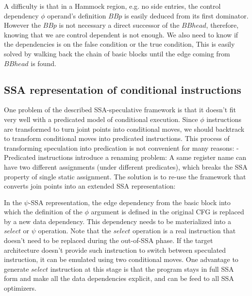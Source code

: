 A difficulty is that in a Hammock region, e.g. no side entries, the control dependency $\phi$ operand's definition $BBp$ is easily deduced from its first dominator. However the $BBp$ is not necessary a direct successor of the $BBhead$, therefore, knowing that we are control dependent is not enough. We also need to know if the dependencies is on the false condition or the true condition, This is easily solved by walking back the chain of basic blocks until the edge coming from $BBhead$ is found.

\subsection{SSA representation of conditional instructions}

One problem of the described SSA-speculative framework is that it doesn't fit very well with a predicated model of conditional execution. Since $\phi$ instructions are transformed to turn joint points into conditional moves, we should backtrack to transform conditional moves into predicated instructions. This process of transforming speculation into predication is not convenient for many reasons:
- Predicated instructions introduce a renaming problem: A same register name can have two different assignments (under different predicates), which breaks the SSA property of single static assignment. The solution is to re-use the framework that converts join points into an extended SSA representation:

In the $\psi$-SSA representation, the edge dependency from the basic block into which the definition of the $\phi$ argument is defined in the original CFG is replaced by a new data dependency. This dependency needs to be materialized into a $select$ or $\psi$ operation. Note that the $select$ operation is a real instruction that doesn't need to be replaced during the out-of-SSA phase. If the target architecture doesn't provide such instruction to switch between speculated instruction, it can be emulated using two conditional moves. One advantage to generate $select$ instruction at this stage is that the program stays in full SSA form and make all the data dependencies explicit, and can be feed to all SSA optimizers. 

